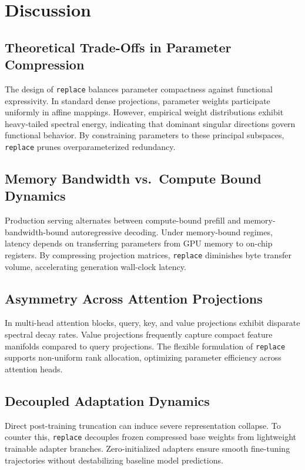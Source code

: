 \section{Discussion}

\subsection{Theoretical Trade-Offs in Parameter Compression}
The design of \texttt{replace} balances parameter compactness against functional expressivity. In standard dense projections, parameter weights participate uniformly in affine mappings. However, empirical weight distributions exhibit heavy-tailed spectral energy, indicating that dominant singular directions govern functional behavior. By constraining parameters to these principal subspaces, \texttt{replace} prunes overparameterized redundancy.

\subsection{Memory Bandwidth vs.\ Compute Bound Dynamics}
Production serving alternates between compute-bound prefill and memory-bandwidth-bound autoregressive decoding. Under memory-bound regimes, latency depends on transferring parameters from GPU memory to on-chip registers. By compressing projection matrices, \texttt{replace} diminishes byte transfer volume, accelerating generation wall-clock latency.

\subsection{Asymmetry Across Attention Projections}
In multi-head attention blocks, query, key, and value projections exhibit disparate spectral decay rates. Value projections frequently capture compact feature manifolds compared to query projections. The flexible formulation of \texttt{replace} supports non-uniform rank allocation, optimizing parameter efficiency across attention heads.

\subsection{Decoupled Adaptation Dynamics}
Direct post-training truncation can induce severe representation collapse. To counter this, \texttt{replace} decouples frozen compressed base weights from lightweight trainable adapter branches. Zero-initialized adapters ensure smooth fine-tuning trajectories without destabilizing baseline model predictions.

